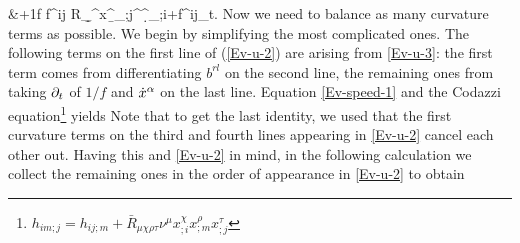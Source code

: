 {{            \hp{=}&+\fr 1f f^{ij} \-R_{\a\b\g\d}^{\a}x^{\b}_{;j}^{\g}\nu^{\d}_{;i}+f^{ij}\del_{t}.}
Now we need to balance as many curvature terms as possible. We begin by simplifying the most complicated ones. The following terms on the first line of (\ref{Ev-u-2}) are arising from \eqref{Ev-u-3}: the first term comes from differentiating $b^{rl}$ on the second line, the remaining ones from taking $\partial_{t}$ of $1/f$ and $\dot{x}^{\alpha}$ on the last line. Equation \eqref{Ev-speed-1} and the Codazzi equation\footnote{$h_{im;j}=h_{ij;m}+\bar{R}_{\mu\chi\rho\tau}\nu^{\mu}x^{\chi}_{;i}x^{\rho}_{;m}x^{\tau}_{;j}$} yields
Note that to get the last identity, we used that the first curvature terms on the third and fourth lines appearing in \eqref{Ev-u-2} cancel each other out. Having this and \eqref{Ev-u-2} in mind, in the following calculation we collect the remaining ones in the order of appearance in \eqref{Ev-u-2} to obtain 
}
